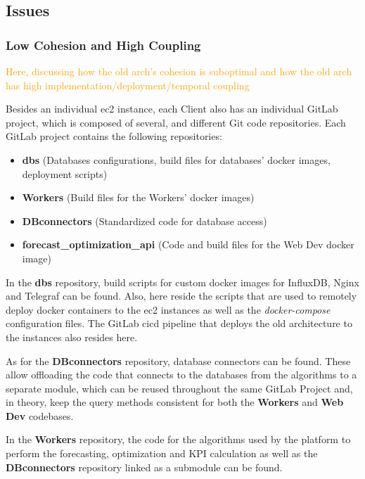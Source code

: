 \subsection{Issues}\label{methodology:ss:Issues}
\subsubsection{Low Cohesion and High Coupling}\label{methodology:sss:low-cohesion-and-high-coupling}


\textcolor{orange}{ Here, discussing how the old arch's cohesion is suboptimal and how the old arch has high implementation/deployment/temporal coupling}

Besides an individual \gls{ec2} instance, each Client also has an individual GitLab \parencite{gitlab_2022} project, which is composed of several, and different Git \parencite{git} code repositories. Each GitLab project contains the following repositories:

\begin{itemize}

    \item \textbf{dbs} (Databases configurations, build files for databases' docker images, deployment scripts)
    \item \textbf{Workers} (Build files for the Workers' docker images)
    \item \textbf{DBconnectors} (Standardized code for database access)
    \item \textbf{forecast\_optimization\_api} (Code and build files for the Web Dev docker image)
    
\end{itemize}

In the \textbf{dbs} repository, build scripts for custom docker images for InfluxDB, Nginx and Telegraf can be found. Also, here reside the scripts that are used to remotely deploy docker containers to the \gls{ec2} instances as well as the \textit{docker-compose} configuration files. The GitLab \gls{cicd} pipeline that deploys the old architecture to the instances also resides here.

As for the \textbf{DBconnectors} repository, database connectors can be found. These allow offloading the code that connects to the databases from the algorithms to a separate module, which can be reused throughout the same GitLab Project and, in theory, keep the query methods consistent for both the \textbf{Workers} and \textbf{Web Dev} codebases.

In the \textbf{Workers} repository, the code for the algorithms used by the platform to perform the forecasting, optimization and KPI calculation as well as the \textbf{DBconnectors} repository linked as a submodule can be found.

